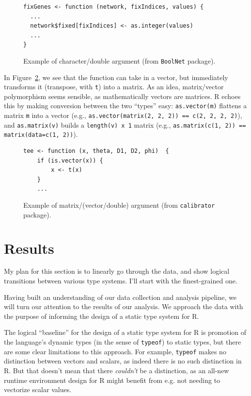 \documentclass[acmsmall,10pt,review,anonymous]{acmart}\settopmatter{printfolios=true,printccs=false,printacmref=false}
\newcommand{\code}[1]{\lstinline|#1|\xspace}
\begin{document}
\begin{figure}[!hb]{\small\begin{lstlisting}[style=R]
fixGenes <- function (network, fixIndices, values) {
  ...
  network$fixed[fixIndices] <- as.integer(values)
  ...
}
\end{lstlisting}}\caption{Example of character/double argument (from {\tt BoolNet} package).}\label{fig:chardbl}\end{figure}

In Figure~\ref{fig:matvec}, we see that the function can take in a vector, but immediately transforms it (transpose, with {\tt t}) into a matrix.
As an idea, matrix/vector polymorphism seems sensible, as mathematically vectors are matrices.
R echoes this by making conversion between the two ``types'' easy:
\code{as.vector(m)} flattens a matrix \code{m} into a vector (e.g., \code{as.vector(matrix(2, 2, 2)) == c(2, 2, 2, 2)}), and \code{as.matrix(v)} builds a {\tt length(v) x 1} matrix (e.g., \code{as.matrix(c(1, 2)) == matrix(data=c(1, 2))}).

\begin{figure}[!hb]{\small\begin{lstlisting}[style=R]
tee <- function (x, theta, D1, D2, phi)  {
    if (is.vector(x)) {
        x <- t(x)
    }
    ...
\end{lstlisting}}\caption{Example of matrix/(vector/double) argument (from {\tt calibrator} package).}\label{fig:matvec}\end{figure}

%
%
%
%
%
%
\section{Results}\label{sec:results}

 My plan for this section is to linearly go through the
data, and show logical transitions between various type systems.  I'll start
with the finest-grained one.

Having built an understanding of our data collection and analysis
pipeline, we will turn our attention to the results of our analysis.  We
approach the data with the purpose of informing the design of a static type
system for R. 

The logical ``baseline'' for the design of a static type system for R is
promotion of the language's dynamic types (in the sense of \code{typeof}) to
static types, but there are some clear limitations to this approach.  For
example, \code{typeof} makes no distinction between vectors and scalars, as
indeed there is no such distinction in R.  But that doesn't mean that there
{\it couldn't} be a distinction, as an all-new runtime environment design
for R might benefit from e.g. not needing to vectorize scalar values.
\end{document}
